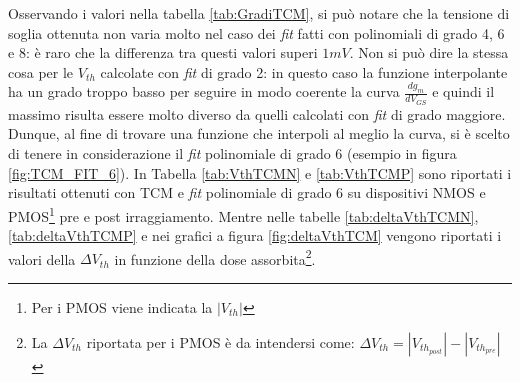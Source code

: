 Osservando i valori nella tabella \ref{tab:GradiTCM}, si può notare che la tensione di soglia ottenuta non varia molto nel caso dei \emph{fit} fatti con polinomiali di grado 4, 6 e 8: è raro che la differenza tra questi valori superi $1 mV$. Non si può dire la stessa cosa per le $V_{th}$ calcolate con \emph{fit} di grado 2: in questo caso la funzione interpolante ha un grado troppo basso per seguire in modo coerente la curva $\frac{dg_m}{dV_{GS}}$ e quindi il massimo risulta essere molto diverso da quelli calcolati con \emph{fit} di grado maggiore. Dunque, al fine di trovare una funzione che interpoli al meglio la curva, si è scelto di tenere in considerazione il \emph{fit} polinomiale di grado 6 (esempio in figura \ref{fig:TCM_FIT_6}). In Tabella \ref{tab:VthTCMN} e \ref{tab:VthTCMP} sono riportati i risultati ottenuti con TCM e \emph{fit} polinomiale di grado 6 su dispositivi NMOS e PMOS\footnote{Per i PMOS viene indicata la $|V_{th}|$ } pre e post irraggiamento.
Mentre nelle tabelle \ref{tab:deltaVthTCMN}, \ref{tab:deltaVthTCMP} e nei grafici a figura \ref{fig:deltaVthTCM} vengono riportati i valori della $\Delta V_{th}$ in funzione della dose assorbita\footnote{La $\Delta V_{th} $ riportata per i PMOS è da intendersi come: $\Delta V_{th} = |V_{th_{post}}| - |V_{th_{pre}}|$}.

\clearpage


